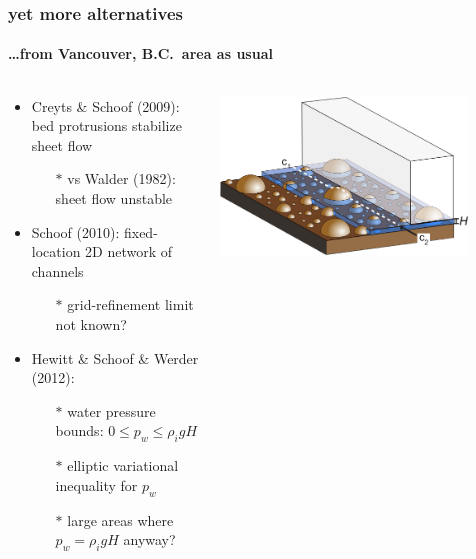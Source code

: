 \documentclass[hide notes,intlimits]{beamer}
\begin{document}
\begin{frame}
  \frametitle{yet more alternatives}
  \framesubtitle{\dots from Vancouver, B.C.~area as usual}

\small
\begin{columns}
\begin{column}{0.6\textwidth}
  \begin{itemize}
  \item  Creyts \& Schoof (2009): bed protrusions stabilize sheet flow
      \begin{itemize}
      \vspace{-1mm}
      \item[$\ast$] vs Walder (1982): sheet flow unstable
      \end{itemize}

  \bigskip
  \item  Schoof (2010): fixed-location 2D network of channels
      \begin{itemize}
      \vspace{-1mm}
      \item[$\ast$] grid-refinement limit not known?
      \end{itemize}
      
  \bigskip
  \item  Hewitt \& Schoof \& Werder (2012):
      \begin{itemize}
      \vspace{-1mm}
      \item[$\ast$] water pressure bounds: $0 \le p_w \le \rho_i g H$
      \item[$\ast$] elliptic variational inequality for $p_w$
      \item[$\ast$] large areas where $p_w = \rho_i g H$ anyway?
      \end{itemize}
  \end{itemize}
\end{column}

\begin{column}{0.4\textwidth}
\begin{center}
\vspace{-5mm}
\includegraphics[width=0.85\textwidth]{figs/creyts-sheetflow}


\end{center}
\end{column}
\end{columns}
\end{frame}
\end{document}
